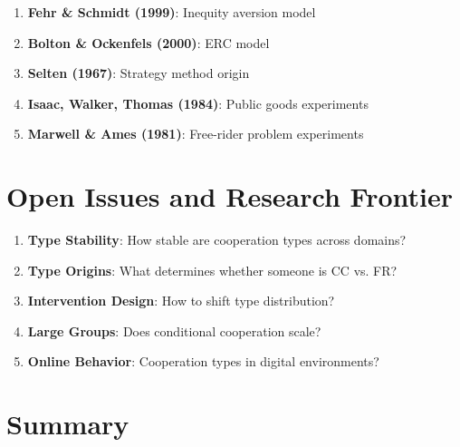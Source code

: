 \begin{tcolorbox}[colback=orange!5!white,colframe=orange!75!black,title=Critical Foundations]
\begin{enumerate}
    \item \textbf{Fehr \& Schmidt (1999)}: Inequity aversion model
    \item \textbf{Bolton \& Ockenfels (2000)}: ERC model
    \item \textbf{Selten (1967)}: Strategy method origin
    \item \textbf{Isaac, Walker, Thomas (1984)}: Public goods experiments
    \item \textbf{Marwell \& Ames (1981)}: Free-rider problem experiments
\end{enumerate}
\end{tcolorbox}

\section{Open Issues and Research Frontier}

\begin{enumerate}
    \item \textbf{Type Stability}: How stable are cooperation types across domains?
    \item \textbf{Type Origins}: What determines whether someone is CC vs. FR?
    \item \textbf{Intervention Design}: How to shift type distribution?
    \item \textbf{Large Groups}: Does conditional cooperation scale?
    \item \textbf{Online Behavior}: Cooperation types in digital environments?
\end{enumerate}

\section{Summary}


